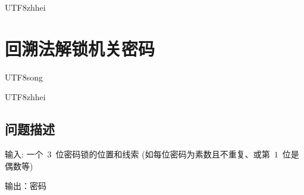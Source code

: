 \documentclass[10.5pt,compsoc]{CjC}
\theoremstyle{mystyle}
\begin{document}
\begin{CJK*}{UTF8}{zhhei}
\vskip 1mm
\section{回溯法解锁机关密码}
\end{CJK*}

\begin{CJK*}{UTF8}{song}
\begin{CJK*}{UTF8}{zhhei}\subsection{问题描述}\end{CJK*}

输入: 一个~$3$~位密码锁的位置和线索 (如每位密码为素数且不重复、或第~$1$~位是偶数等)

输出：密码

\end{CJK*}
\end{document}
